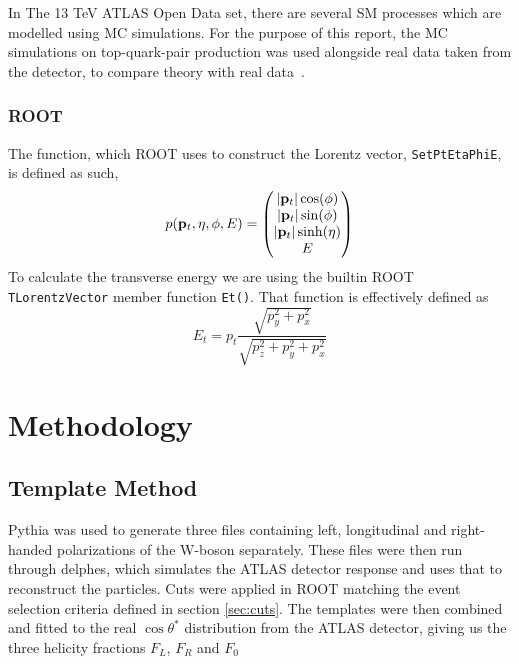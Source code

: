 \documentclass[12pt,a4paper]{article}
\numberwithin{equation}{section}
\begin{document}
In The 13 TeV ATLAS Open Data set, there are several SM processes which are
modelled using MC simulations. For the purpose of this report, the MC
simulations on top-quark-pair production was used alongside real data taken from
the detector, to compare theory with real data~\cite{mcopenatlas}.

\subsubsection{ROOT}
The function, which ROOT uses to construct the Lorentz vector, \texttt{SetPtEtaPhiE}, is defined as such,
\begin{equation}
  p({\vb p_t}, \eta, \phi, E) =
  \begin{pmatrix}
    |{\vb p_t}| \cos(\phi)\\ |{\vb p_t}|\sin(\phi)\\ |{\vb p_t}| \sinh(\eta)\\ E
  \end{pmatrix}
\end{equation}
To calculate the
transverse energy we are using the builtin ROOT \texttt{TLorentzVector} member
function \texttt{Et()}. That function is effectively defined as
\begin{equation}
  E_t = p_t \frac{\sqrt{p_y^2+p_x^2}}{\sqrt{p_z^2+p_y^2+p_x^2}}
\end{equation}

\section{Methodology}
\subsection{Template Method}
Pythia was used to generate three files containing left, longitudinal and right-handed polarizations of the W-boson separately. These files were then run through delphes, which simulates the ATLAS detector response and uses that to reconstruct the particles. Cuts were applied in ROOT matching the event selection criteria defined in section \ref{sec:cuts}. The templates were then combined and fitted to the real $\cos \theta^{*}$ distribution from the ATLAS detector, giving us the three helicity fractions $F_L$, $F_R$ and $F_0$
\end{document}

